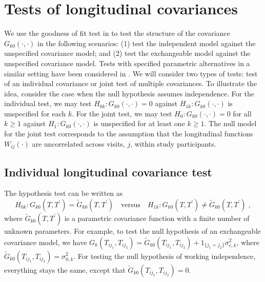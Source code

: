 \documentclass[submit]{smj}
\begin{document}
\section{Tests of longitudinal covariances} \label{sec:test}
We  use the goodness of fit test in \citet{Chen2019} to test the  structure of the  covariance $G_{k0}(\cdot,\cdot)$ in the following scenarios: (1) test the independent model against the unspecified covariance model; and (2) test the exchangeable model against the unspecified covariance model. Tests with specified parametric alternatives in a similar setting have been considered in \citet{Park2015}. We will consider two types of tests: test of an individual covariance or joint test of multiple covariances. 
To illustrate the idea, consider the case when the null hypothesis assumes  independence. For the individual test, we may test $H_{0k}: G_{k0}(\cdot, \cdot) = 0$ against $H_{1k}: G_{k0}(\cdot,\cdot)$ is unspecified for each $k$.  For the joint test, we may test $H_0: G_{k0}(\cdot,\cdot) = 0$ for all $k\geq 1$ against $H_1: G_{k0}(\cdot,\cdot)$ is unspecified for at least  one $k\geq 1$. The null model for the joint test corresponds to the assumption that the longitudinal functions $W_{ij}(\cdot)$ are uncorrelated across visits, $j$, within study participants.

\subsection{Individual longitudinal covariance test}

The hypothesis test can be written as 
\begin{equation}
\label{eq:hypotest}
H_{0k}: G_{k0}(T,T^{\prime})=\widetilde{G}_{k0}(T,T^{\prime}) \quad\text{versus}\quad H_{1k}: G_{k0}(T,T^{\prime}) \neq \widetilde{G}_{k0}(T,T^{\prime})\;,
\end{equation}
where $\widetilde{G}_{k0}(T,T^{\prime})$ is a parametric covariance function with a finite number of unknown parameters. For example, to test the null hypothesis of an exchangeable covariance model, we have $G_{k}(T_{ij_1},T_{ij_2}) = \widetilde{G}_{k0}(T_{ij_1},T_{ij_2}) + 1_{\{j_1=j_2\}}\sigma^2_{e,k}$, where $\widetilde{G}_{k0}(T_{ij_1},T_{ij_2}) = \sigma^2_{0,k}$.
For testing the null hypothesis of working independence, everything stays the same, except that $\widetilde{G}_{k0}(T_{ij_1},T_{ij_2}) = 0$.
\end{document}
